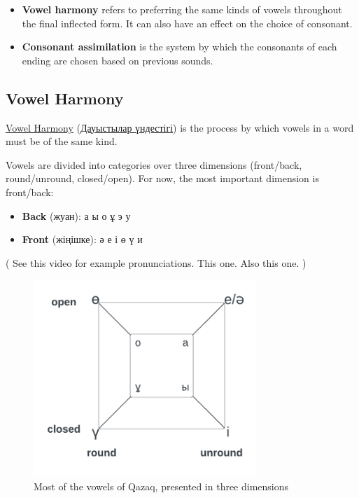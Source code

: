 \documentclass[main.tex]{subfiles}
\begin{document}
\begin{itemize}
	\item \textbf{Vowel harmony} refers to preferring the same kinds of vowels throughout the final inflected form. It can also have an effect on the choice of consonant.
	\item \textbf{Consonant assimilation} is the system by which the consonants of each ending are chosen based on previous sounds.
\end{itemize}

\subsection{Vowel Harmony}
\href{https://en.wikipedia.org/wiki/Vowel_harmony#Kazakh}{Vowel Harmony} (\href{https://kk.wikipedia.org/wiki/\%D0\%94\%D0\%B0\%D1\%83\%D1\%8B\%D1\%81\%D1\%82\%D1\%8B\%D0\%BB\%D0\%B0\%D1\%80_\%D2\%AF\%D0\%BD\%D0\%B4\%D0\%B5\%D1\%81\%D1\%82\%D1\%96\%D0\%B3\%D1\%96}{Дауыстылар үндестігі}) is the process by which vowels in a word must be of the same kind.

Vowels are divided into categories over three dimensions (front/back, round/unround, closed/open). For now, the most important dimension is front/back:

\begin{itemize}
	\item \textbf{Back} (жуан): а ы о ұ э у
	\item \textbf{Front} (жіңішке): ә е і ө ү и
\end{itemize}

( See this video for example pronunciations. This one. Also this one. )

\begin{figure}[H]
	\centering
	\includegraphics[width=0.75\textwidth]{kk-vowels-3d.png}
	\caption{Most of the vowels of Qazaq, presented in three dimensions}
\end{figure}
\end{document}
